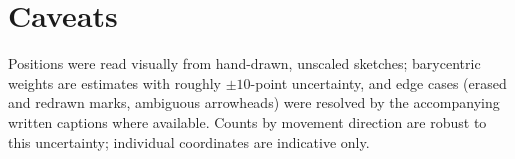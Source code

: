 \documentclass[11pt]{article}
\begin{document}
\section*{Caveats}
Positions were read visually from hand-drawn, unscaled sketches; barycentric
weights are estimates with roughly $\pm 10$-point uncertainty, and edge cases
(erased and redrawn marks, ambiguous arrowheads) were resolved by the
accompanying written captions where available. Counts by movement direction are
robust to this uncertainty; individual coordinates are indicative only.
\end{document}
